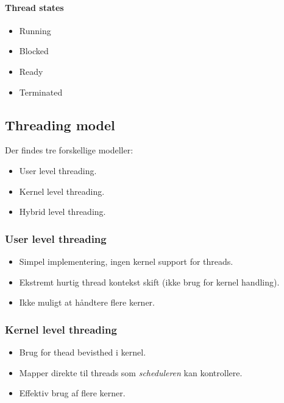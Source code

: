 \paragraph{Thread states}
\begin{itemize}
	\item Running
	\item Blocked
	\item Ready
	\item Terminated
\end{itemize}

\subsection{Threading model}
Der findes tre forskellige modeller:

\begin{itemize}
	\item User level threading.
	\item Kernel level threading.
	\item Hybrid level threading.
\end{itemize}

\subsubsection*{User level threading}
\begin{itemize}
	\item Simpel implementering, ingen kernel support for threads.
	\item Ekstremt hurtig thread kontekst skift (ikke brug for kernel handling).
	\item Ikke muligt at håndtere flere kerner.
\end{itemize}


\subsubsection*{Kernel level threading}
\begin{itemize}
	\item Brug for thead bevisthed i kernel.
	\item Mapper direkte til threads som \textit{scheduleren} kan kontrollere.
	\item Effektiv brug af flere kerner.
\end{itemize}

